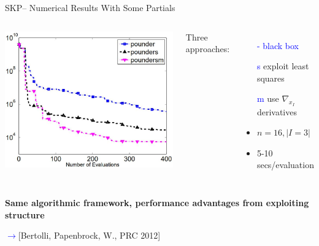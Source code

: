 \documentclass[handout,aspectratio=54]{beamer}
\numberwithin{theorem}{section}
\begin{document}
\begin{frame}{SKP– Numerical Results With Some Partials}
\begin{columns}
\includegraphics[width=\textwidth]{fig/58.jpg}

Three approaches:
\begin{itemize}\footnotesize
\item[\textcolor{blue}{-}] \textcolor{blue}{black box}
\item[\textcolor{blue}{s}] exploit least squares
\item[\textcolor{blue}{m}] \textcolor[RGB]{255,105,180}{use $\nabla_{x_I}$ derivatives}
\item $n=16,|I=3|$
\item 5-10 secs/evaluation
\end{itemize}
\end{columns}

\normalsize
\begin{center}
\textbf{Same algorithmic framework, performance advantages from exploiting structure}
\end{center}

\flushright\footnotesize
\textcolor{blue}{$\rightarrow$}\textcolor[RGB]{128,0,128}{[Bertolli, Papenbrock, W., PRC 2012]}
\end{frame}
\end{document}

